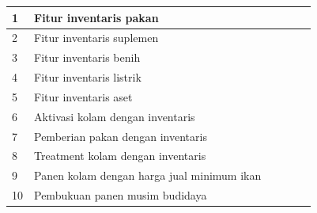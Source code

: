 \begin{spacing}{1.5}
\begin{enumerate}
\begin{longtable}[c]{@{} |p{1cm}|p{6.5cm}|p{1.1cm}|p{1.1cm}|p{1.1cm}|p{1.1cm}| @{}}
	\hline
	1 & Fitur inventaris pakan &  &  &  &\\
	\hline
	2 & Fitur inventaris suplemen &  &  &  &\\
	\hline
	3 &	Fitur inventaris benih &  &  &  &\\
	\hline
	4 & Fitur inventaris listrik &  &  &  &\\
	\hline
	5 & Fitur inventaris aset &  &  &  &\\
	\hline
	6 & Aktivasi kolam dengan inventaris &  &  &  &\\
	\hline
	7 & Pemberian pakan dengan inventaris &  &  &  &\\
	\hline
	8 & Treatment kolam dengan inventaris &  &  &  &\\
	\hline
	9 & Panen kolam dengan harga jual minimum ikan &  &  &  &\\
	\hline
	10 & Pembukuan panen musim budidaya &  &  &  &\\
	\hline
	\end{longtable}
\end{enumerate}





\end{spacing}
